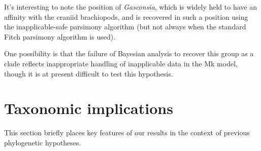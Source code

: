 \documentclass[]{book}
\theoremstyle{definition}
\theoremstyle{definition}
\theoremstyle{definition}
\theoremstyle{remark}
\begin{document}
It's interesting to note the position of \emph{Gasconsia}, which is
widely held to have an affinity with the craniid brachiopods, and is
recovered in such a position using the inapplicable-safe parsimony
algorithm (but not always when the standard Fitch parsimony algorithm is
used).

One possibility is that the failure of Bayesian analysis to recover this
group as a clade reflects inappropriate handling of inapplicable data in
the Mk model, though it is at present difficult to test this hypothesis.

\hypertarget{taxonomic-implications}{%
\chapter{Taxonomic implications}\label{taxonomic-implications}}

This section briefly places key features of our results in the context
of previous phylogenetic hypotheses.
\end{document}
